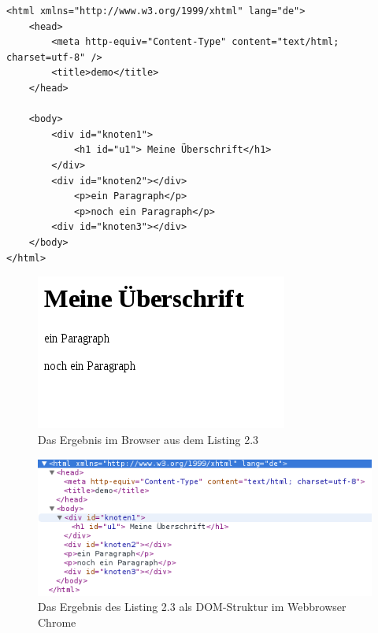 \begin{lstlisting}[caption={Beispiel f\"ur ein einfaches HTML-Dokument}]
<html xmlns="http://www.w3.org/1999/xhtml" lang="de">
    <head>    
        <meta http-equiv="Content-Type" content="text/html; charset=utf-8" />
        <title>demo</title>
    </head>    
    
    <body>        
        <div id="knoten1">            
            <h1 id="u1"> Meine Überschrift</h1>
        </div>
        <div id="knoten2"></div>
            <p>ein Paragraph</p>
            <p>noch ein Paragraph</p>
        <div id="knoten3"></div>
    </body>
</html>

\end{lstlisting}

\begin{figure}[h]
  \centering
  \includegraphics[scale=0.6]{fotos/kapitel2/ergebnis_html.png}
  \caption{Das Ergebnis im Browser aus dem Listing 2.3}
 
\end{figure}

\begin{figure}[h]
  \centering
  \includegraphics[scale=0.7]{fotos/kapitel2/dom_elements.png}
  \caption{Das Ergebnis des Listing 2.3 als DOM-Struktur im Webbrowser Chrome}
 
\end{figure}

